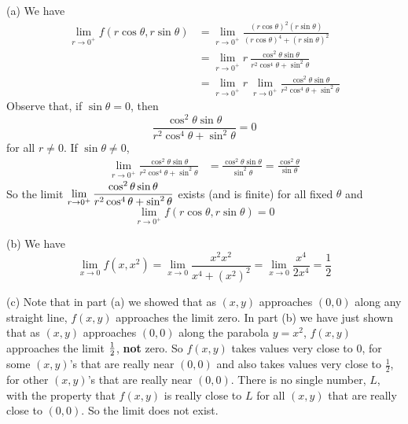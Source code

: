 \begin{solution}
(a) We have
\begin{align*}
\lim_{r\rightarrow 0^+}f(r\cos\theta,r\sin\theta)
&=\lim_{r\rightarrow 0^+}
\frac{(r\cos\theta)^2(r\sin\theta)}{(r\cos\theta)^4+(r\sin\theta)^2} \\
&=\lim_{r\rightarrow 0^+}r\ \frac{\cos^2\theta\sin\theta}{r^2\cos^4\theta+\sin^2\theta} \\
&=\lim_{r\rightarrow 0^+}r\ 
\lim_{r\rightarrow 0^+}\frac{\cos^2\theta\sin\theta}
                         {r^2\cos^4\theta+\sin^2\theta}
\end{align*}
Observe that, if $\sin\theta=0$, then
\begin{equation*}
\frac{\cos^2\theta\sin\theta}{r^2\cos^4\theta+\sin^2\theta}=0
\end{equation*}
for all $r\ne 0$. If $\sin\theta\ne 0$,
\begin{align*}
\lim_{r\rightarrow 0^+}   
     \frac{\cos^2\theta\sin\theta}{r^2\cos^4\theta+\sin^2\theta}
&=\frac{\cos^2\theta\sin\theta}{\sin^2\theta}
=\frac{\cos^2\theta}{\sin\theta}
\end{align*}
So the limit 
$\displaystyle\lim_{r\rightarrow 0^+}
\frac{\cos^2\theta\sin\theta}{r^2\cos^4\theta+\sin^2\theta}$
exists (and is finite) for all fixed $\theta$ and 
\begin{equation*}
\lim\limits_{r\rightarrow 0^+}f(r\cos\theta,r\sin\theta)=0
\end{equation*}

(b) We have
\begin{equation*}
\lim_{x\rightarrow 0}f(x,x^2)
=\lim_{x\rightarrow 0}\frac{x^2x^2}{x^4+{(x^2)}^2}
=\lim_{x\rightarrow 0}\frac{x^4}{2x^4}
=\frac{1}{2}
\end{equation*}

(c)
Note that in part (a) we showed that as $(x,y)$ approaches $(0,0)$ along
any straight line, $f(x,y)$ approaches the limit zero.
In part (b) we have just shown that as $(x,y)$ approaches $(0,0)$ along
the parabola $y=x^2$, $f(x,y)$ approaches the limit $\tfrac{1}{2}$, {\bf not} zero.
So $f(x,y)$ takes values very close to $0$, for some $(x,y)$'s 
that are  really near $(0,0)$ and also takes values very close to 
$\frac{1}{2}$, for other $(x,y)$'s that are  really near $(0,0)$.
There is no single number, $L$, with the property that
$f(x,y)$ is really close to $L$ for all $(x,y)$ that are really 
close to $(0,0)$. So the limit does not exist.

\end{solution}

